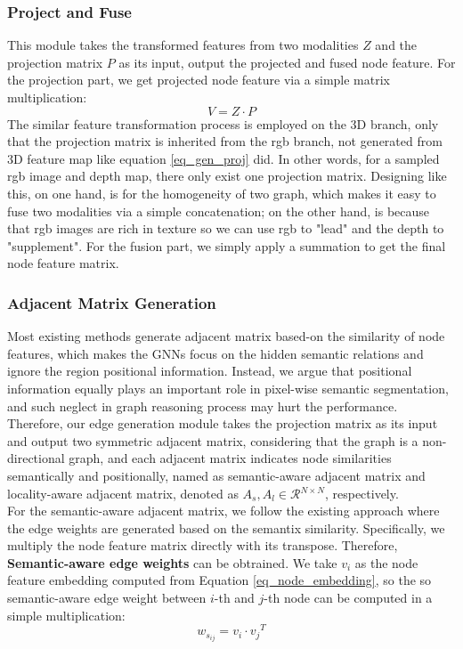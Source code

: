 \documentclass[journal]{IEEEtran}
\begin{document}
\subsubsection{Project and Fuse}
       
    This module takes the transformed features from two modalities $Z$ and the projection matrix $P$ as its input, output the projected and fused node feature. For the projection part, we get projected node feature via a simple matrix multiplication:
    \begin{equation} 
        V = Z \cdot P
        \label{eq_node_embedding}
    \end{equation}
    The similar feature transformation process is employed on the 3D branch, only that the projection matrix is inherited from the rgb branch, not generated from 3D feature map like equation \ref{eq_gen_proj} did. In other words, for a sampled rgb image and depth map, there only exist one projection matrix. Designing like this, on one hand, is for the homogeneity of two graph, which makes it easy to fuse two modalities via a simple concatenation; on the other hand, is because that rgb images are rich in texture so we can use rgb to "lead" and the depth to "supplement". For the fusion part, we simply apply a summation to get the final node feature matrix. \\   

    
   
\subsubsection{Adjacent Matrix Generation}  \label{sec_sub_gen_edge} 
    Most existing methods generate adjacent matrix based-on the similarity of node features, which makes the GNNs focus on the hidden semantic relations and ignore the region positional information. Instead, we argue that positional information equally plays an important role in pixel-wise semantic segmentation, and such neglect in graph reasoning process may hurt the performance. Therefore, our edge generation module takes the projection matrix as its input and output two symmetric adjacent matrix, considering that the graph is a non-directional graph, and each adjacent matrix indicates node similarities semantically and positionally, named as semantic-aware adjacent matrix and locality-aware adjacent matrix, denoted as $A_s, A_l \in \mathcal{R}{^{N \times N}}$, respectively. \\

    For the semantic-aware adjacent matrix, we follow the existing approach where the edge weights are generated based on the semantix similarity. Specifically, we multiply the node feature matrix directly with its transpose. Therefore, \textbf{Semantic-aware edge weights} can be obtrained. We take $v_i$ as the node feature embedding computed from Equation \ref{eq_node_embedding}, so the so semantic-aware edge weight between $i$-th and $j$-th node can be computed in a simple multiplication:
    \begin{equation}\label{eq_adj_semantic}
        w_{s_{ij}} = v_i \cdot {v_j}^T
    \end{equation} \\
    
\end{document}
